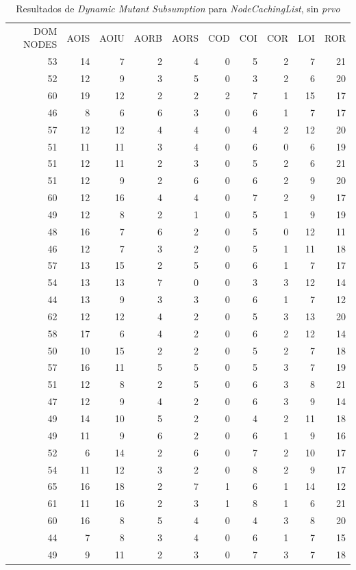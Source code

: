 \begin{table}[]
	\caption{Resultados de \emph{Dynamic Mutant Subsumption} para \emph{NodeCachingList}, sin \emph{prvo}}
	\label{tables.results.subsumption.ncll.noprvo}
	\centering
	\scriptsize
	\def\arraystretch{0.95}
	\setlength\tabcolsep{0.5mm}
	\begin{tabular}{rrrrrrrrrr}
		DOM NODES & AOIS & AOIU & AORB & AORS & COD & COI & COR & LOI & ROR \\
		53 & 14 & 7 & 2 & 4 & 0 & 5 & 2 & 7 & 21 \\
		52 & 12 & 9 & 3 & 5 & 0 & 3 & 2 & 6 & 20 \\
		60 & 19 & 12 & 2 & 2 & 2 & 7 & 1 & 15 & 17 \\
		46 & 8 & 6 & 6 & 3 & 0 & 6 & 1 & 7 & 17 \\
		57 & 12 & 12 & 4 & 4 & 0 & 4 & 2 & 12 & 20 \\
		51 & 11 & 11 & 3 & 4 & 0 & 6 & 0 & 6 & 19 \\
		51 & 12 & 11 & 2 & 3 & 0 & 5 & 2 & 6 & 21 \\
		51 & 12 & 9 & 2 & 6 & 0 & 6 & 2 & 9 & 20 \\
		60 & 12 & 16 & 4 & 4 & 0 & 7 & 2 & 9 & 17 \\
		49 & 12 & 8 & 2 & 1 & 0 & 5 & 1 & 9 & 19 \\
		48 & 16 & 7 & 6 & 2 & 0 & 5 & 0 & 12 & 11 \\
		46 & 12 & 7 & 3 & 2 & 0 & 5 & 1 & 11 & 18 \\
		57 & 13 & 15 & 2 & 5 & 0 & 6 & 1 & 7 & 17 \\
		54 & 13 & 13 & 7 & 0 & 0 & 3 & 3 & 12 & 14 \\
		44 & 13 & 9 & 3 & 3 & 0 & 6 & 1 & 7 & 12 \\
		62 & 12 & 12 & 4 & 2 & 0 & 5 & 3 & 13 & 20 \\
		58 & 17 & 6 & 4 & 2 & 0 & 6 & 2 & 12 & 14 \\
		50 & 10 & 15 & 2 & 2 & 0 & 5 & 2 & 7 & 18 \\
		57 & 16 & 11 & 5 & 5 & 0 & 5 & 3 & 7 & 19 \\
		51 & 12 & 8 & 2 & 5 & 0 & 6 & 3 & 8 & 21 \\
		47 & 12 & 9 & 4 & 2 & 0 & 6 & 3 & 9 & 14 \\
		49 & 14 & 10 & 5 & 2 & 0 & 4 & 2 & 11 & 18 \\
		49 & 11 & 9 & 6 & 2 & 0 & 6 & 1 & 9 & 16 \\
		52 & 6 & 14 & 2 & 6 & 0 & 7 & 2 & 10 & 17 \\
		54 & 11 & 12 & 3 & 2 & 0 & 8 & 2 & 9 & 17 \\
		65 & 16 & 18 & 2 & 7 & 1 & 6 & 1 & 14 & 12 \\
		61 & 11 & 16 & 2 & 3 & 1 & 8 & 1 & 6 & 21 \\
		60 & 16 & 8 & 5 & 4 & 0 & 4 & 3 & 8 & 20 \\
		44 & 7 & 8 & 3 & 4 & 0 & 6 & 1 & 7 & 15 \\
		49 & 9 & 11 & 2 & 3 & 0 & 7 & 3 & 7 & 18
	\end{tabular}
\end{table}

